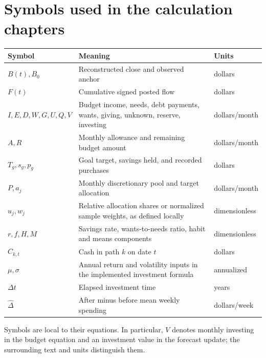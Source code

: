 \section{Symbols used in the calculation chapters}
\begin{tabularx}{\textwidth}{@{}lYl@{}}
\toprule Symbol & Meaning & Units\\\midrule
\(B(t), B_0\) & Reconstructed close and observed anchor & dollars\\
\(F(t)\) & Cumulative signed posted flow & dollars\\
\(I,E,D,W,G,U,Q,V\) & Budget income, needs, debt payments, wants, giving, unknown, reserve, investing & dollars/month\\
\(A,R\) & Monthly allowance and remaining budget amount & dollars/month\\
\(T_g,s_g,p_g\) & Goal target, savings held, and recorded purchases & dollars\\
\(P,a_j\) & Monthly discretionary pool and target allocation & dollars/month\\
\(u_j,w_j\) & Relative allocation shares or normalized sample weights, as defined locally & dimensionless\\
\(r,f,H,M\) & Savings rate, wants-to-needs ratio, habit and means components & dimensionless\\
\(C_{k,t}\) & Cash in path \(k\) on date \(t\) & dollars\\
\(\mu,\sigma\) & Annual return and volatility inputs in the implemented investment formula & annualized\\
\(\Delta t\) & Elapsed investment time & years\\
\(\widehat{\Delta}\) & After minus before mean weekly spending & dollars/week\\
\bottomrule
\end{tabularx}

Symbols are local to their equations. In particular, \(V\) denotes monthly investing in the budget equation and an investment value in the forecast update; the surrounding text and units distinguish them.
